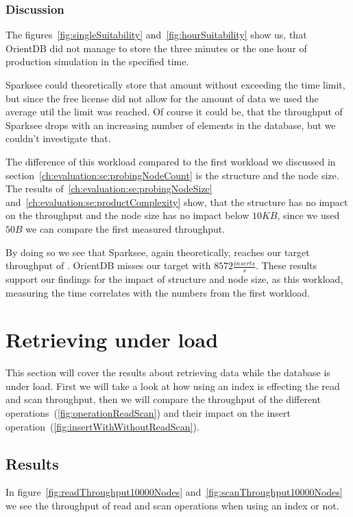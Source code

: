 \subsubsection{Discussion}
\label{ch:evaluation:se:suitabilityDiscussion}
The figures~\ref{fig:singleSuitability} and~\ref{fig:hourSuitability} show us,
that OrientDB did not manage to store the three minutes or the one hour of production simulation in the specified time.

Sparksee could theoretically store that amount without exceeding the time limit,
but since the free license did not allow for the amount of data we used the average util the limit was reached.
Of course it could be,
that the throughput of Sparksee drops with an increasing number of elements in the database,
but we couldn't investigate that.

The difference of this workload compared to the first workload we discussed in section~\ref{ch:evaluation:se:probingNodeCount} is the structure and the node size.
The results of~\ref{ch:evaluation:se:probingNodeSize} and~\ref{ch:evaluation:se:productComplexity} show,
that the structure has no impact on the throughput and the node size has no impact below $ 10KB $,
since we used $ 50B $ we can compare the first measured throughput.

By doing so we see that Sparksee,
again theoretically,
reaches our target throughput of .
OrientDB misses our target with $ 8572 \frac{inserts}{s} $.
These results support our findings for the impact of structure and node size,
as this workload,
measuring the time correlates with the numbers from the first workload.

\section{Retrieving under load}
\label{ch:evaluation:se:retrievingUnderLoad}
This section will cover the results about retrieving data while the database is under load.
First we will take a look at how using an index is effecting the read and scan throughput,
then we will compare the throughput of the different operations~(\ref{fig:operationReadScan}) and their impact on the insert operation~(\ref{fig:insertWithWithoutReadScan}).

\subsection{Results}
In figure~\ref{fig:readThroughput10000Nodes} and~\ref{fig:scanThroughput10000Nodes} we see the throughput of read and scan operations when using an index or not.

